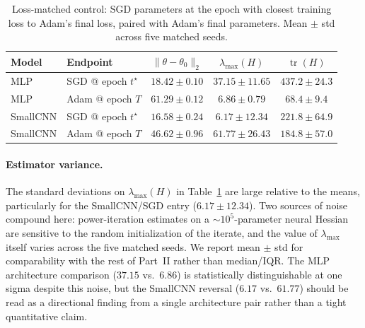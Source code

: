\documentclass[11pt]{article}
\begin{document}
\begin{table}[H]
\centering
\small
\setlength{\tabcolsep}{4pt}
\begin{tabular}{llccc}
\toprule
\textbf{Model} & \textbf{Endpoint} & $\|\theta-\theta_0\|_2$ & $\lambda_{\max}(H)$ & $\operatorname{tr}(H)$ \\
\midrule
MLP      & SGD @ epoch $t^\star$ & $18.42 \pm 0.10$ & $37.15 \pm 11.65$ & $437.2 \pm 24.3$ \\
MLP      & Adam @ epoch $T$      & $61.29 \pm 0.12$ & $6.86 \pm 0.79$   & $68.4 \pm 9.4$  \\
\addlinespace
SmallCNN & SGD @ epoch $t^\star$ & $16.58 \pm 0.24$ & $6.17 \pm 12.34$  & $221.8 \pm 64.9$ \\
SmallCNN & Adam @ epoch $T$      & $46.62 \pm 0.96$ & $61.77 \pm 26.43$ & $184.8 \pm 57.0$ \\
\bottomrule
\end{tabular}
\caption{Loss-matched control: SGD parameters at the epoch with closest training loss to Adam's final loss, paired with Adam's final parameters. Mean $\pm$ std across five matched seeds.}
\label{tab:loss-matched}
\end{table}

\paragraph{Estimator variance.}
The standard deviations on $\lambda_{\max}(H)$ in Table~\ref{tab:loss-matched} are large relative to the means, particularly for the SmallCNN/SGD entry ($6.17 \pm 12.34$). Two sources of noise compound here: power-iteration estimates on a $\sim 10^5$-parameter neural Hessian are sensitive to the random initialization of the iterate, and the value of $\lambda_{\max}$ itself varies across the five matched seeds. We report mean $\pm$ std for comparability with the rest of Part~II rather than median/IQR. The MLP architecture comparison ($37.15$ vs.\ $6.86$) is statistically distinguishable at one sigma despite this noise, but the SmallCNN reversal ($6.17$ vs.\ $61.77$) should be read as a directional finding from a single architecture pair rather than a tight quantitative claim.
\end{document}
